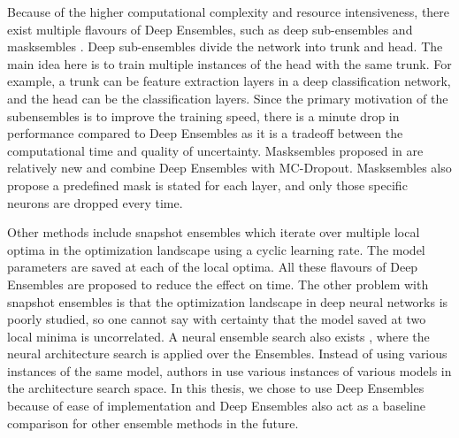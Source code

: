     Because of the higher computational complexity and resource intensiveness, there exist multiple flavours of Deep Ensembles, such as deep sub-ensembles \cite{deep_subensembles} and masksembles \cite{masksembles}.
    Deep sub-ensembles divide the network into trunk and head.
    The main idea here is to train multiple instances of the head with the same trunk. For example, a trunk can be feature extraction layers in a deep classification network, and the head can be the classification layers.
    Since the primary motivation of the subensembles is to improve the training speed, there is a minute drop in performance compared to Deep Ensembles as it is a tradeoff between the computational time and quality of uncertainty.
    Masksembles proposed in \cite{masksembles} are relatively new and combine Deep Ensembles with MC-Dropout.
    Masksembles also propose a predefined mask is stated for each layer, and only those specific neurons are dropped every time.

    Other methods include snapshot ensembles \cite{snapshot_ensembles} which iterate over multiple local optima in the optimization landscape using a cyclic learning rate. 
    The model parameters are saved at each of the local optima. 
    All these flavours of Deep Ensembles are proposed to reduce the effect on time.
    The other problem with snapshot ensembles is that the optimization landscape in deep neural networks is poorly studied, so one cannot say with certainty that the model saved at two local minima is uncorrelated.
    A neural ensemble search also exists \cite{NAS_Ensembles}, where the neural architecture search is applied over the Ensembles.
    Instead of using various instances of the same model, authors in \cite{NAS_Ensembles} use various instances of various models in the architecture search space.
    In this thesis, we chose to use Deep Ensembles because of ease of implementation and Deep Ensembles also act as a baseline comparison for other ensemble methods in the future.

